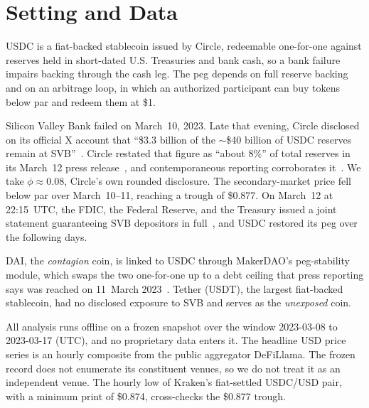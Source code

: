 \section{Setting and Data}
\label{sec:setting}

USDC is a fiat-backed stablecoin issued by Circle, redeemable one-for-one
against reserves held in short-dated U.S. Treasuries and bank cash, so a bank
failure impairs backing through the cash leg. The peg depends on full reserve
backing and on an arbitrage loop, in which an authorized participant can buy
tokens below par and redeem them at \$1.

Silicon Valley Bank failed on March~10, 2023. Late that evening, Circle
disclosed on its official X account that ``\$3.3 billion of the
${\sim}$\$40 billion of USDC reserves remain at SVB''~\cite{circle2023tweet}.
Circle restated that figure as ``about $8\%$'' of total reserves in its
March~12 press release~\cite{circle2023pressrelease}, and contemporaneous
reporting corroborates it~\cite{capoot2023}. We take $\phi\approx 0.08$,
Circle's own rounded disclosure. The
secondary-market price fell below par over March~10--11, reaching a trough of
\$0.877. On March~12 at 22:15~UTC, the FDIC, the Federal Reserve, and the
Treasury issued a joint statement guaranteeing SVB depositors in
full~\cite{fedtreasfdic2023pressrelease}, and USDC restored its peg over the
following days.

DAI, the \emph{contagion} coin, is linked to USDC through MakerDAO's
peg-stability module, which swaps the two one-for-one up to a debt ceiling that
press reporting says was reached on 11~March 2023~\cite{theblock2023psm}.
Tether (USDT), the largest fiat-backed stablecoin, had no disclosed exposure to
SVB and serves as the \emph{unexposed} coin.

All analysis runs offline on a frozen snapshot over the window 2023-03-08 to
2023-03-17 (UTC), and no proprietary data enters it. The headline USD price
series is an hourly composite from the public aggregator DeFiLlama. The frozen
record does not enumerate its constituent venues, so we do not treat it as an
independent venue. The hourly low of Kraken's fiat-settled USDC/USD pair, with a minimum
print of \$0.874, cross-checks the \$0.877 trough.
